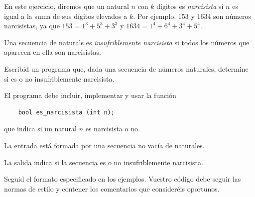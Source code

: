 
\Statement

En este ejercicio, diremos que un natural $n$ con $k$ dígitos es  \emph{narcisista} si $n$ es igual a la suma de  sus dígitos elevados a 
$k$. Por ejemplo, 153 y 1634 son números narcisistas, ya que  $153 = 1^3+5^3+3^3$ y  $1634 = 1^4 + 6^4 + 3^4 + 5^4$. 

\medskip

Una secuencia de naturals es \emph{insufriblemente narcisista} si todos los números que aparecen en ella son narcisistas.

\medskip
Escribid un programa que, dada  una secuencia de números naturales, determine si es o no insufriblemente narcisista. 

\medskip

El programa debe incluir, implementar y usar la  función

\begin{lstlisting}
    bool es_narcisista (int n);
\end{lstlisting}

que indica si un natural $n$ es narcisista o no.

\Input

La entrada está formada por una secuencia no vacía de naturales. 

\Output

La salida indica si la secuencia es o no insufriblemente narcisista. 

\medskip
Seguid el formato especificado en los ejemplos. Vuestro código debe seguir las normas de estilo y contener los comentarios 
que consideréis oportunos.

\Sample
